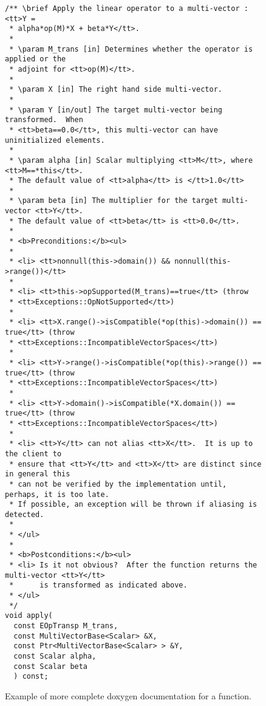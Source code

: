 \begin{figure}
%
{\small\begin{verbatim}
/** \brief Apply the linear operator to a multi-vector : <tt>Y =
 * alpha*op(M)*X + beta*Y</tt>.
 *
 * \param M_trans [in] Determines whether the operator is applied or the
 * adjoint for <tt>op(M)</tt>.
 *
 * \param X [in] The right hand side multi-vector.
 *
 * \param Y [in/out] The target multi-vector being transformed.  When
 * <tt>beta==0.0</tt>, this multi-vector can have uninitialized elements.
 *
 * \param alpha [in] Scalar multiplying <tt>M</tt>, where <tt>M==*this</tt>.
 * The default value of <tt>alpha</tt> is </tt>1.0</tt>
 *
 * \param beta [in] The multiplier for the target multi-vector <tt>Y</tt>.
 * The default value of <tt>beta</tt> is <tt>0.0</tt>.
 * 
 * <b>Preconditions:</b><ul>
 *
 * <li> <tt>nonnull(this->domain()) && nonnull(this->range())</tt>
 *
 * <li> <tt>this->opSupported(M_trans)==true</tt> (throw
 * <tt>Exceptions::OpNotSupported</tt>)
 *
 * <li> <tt>X.range()->isCompatible(*op(this)->domain()) == true</tt> (throw
 * <tt>Exceptions::IncompatibleVectorSpaces</tt>)
 *
 * <li> <tt>Y->range()->isCompatible(*op(this)->range()) == true</tt> (throw
 * <tt>Exceptions::IncompatibleVectorSpaces</tt>)
 *
 * <li> <tt>Y->domain()->isCompatible(*X.domain()) == true</tt> (throw
 * <tt>Exceptions::IncompatibleVectorSpaces</tt>)
 *
 * <li> <tt>Y</tt> can not alias <tt>X</tt>.  It is up to the client to
 * ensure that <tt>Y</tt> and <tt>X</tt> are distinct since in general this
 * can not be verified by the implementation until, perhaps, it is too late.
 * If possible, an exception will be thrown if aliasing is detected.
 *
 * </ul>
 *
 * <b>Postconditions:</b><ul>
 * <li> Is it not obvious?  After the function returns the multi-vector <tt>Y</tt>
 *      is transformed as indicated above.
 * </ul>
 */
void apply(
  const EOpTransp M_trans,
  const MultiVectorBase<Scalar> &X,
  const Ptr<MultiVectorBase<Scalar> > &Y,
  const Scalar alpha,
  const Scalar beta
  ) const;
\end{verbatim}}
%
\caption{\label{fig:complete_func_doc}
Example of more complete doxygen documentation for a function.}
%
\end{figure}


